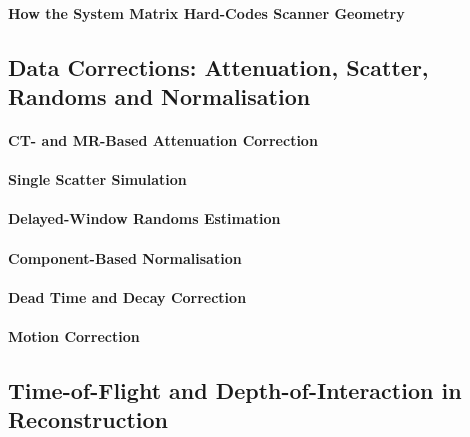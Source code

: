 \paragraph{How the System Matrix Hard-Codes Scanner Geometry}

\subsection{Data Corrections: Attenuation, Scatter, Randoms and Normalisation}
\label{sec:corrections}

\paragraph{CT- and MR-Based Attenuation Correction}

\paragraph{Single Scatter Simulation}

\paragraph{Delayed-Window Randoms Estimation}

\paragraph{Component-Based Normalisation}

\paragraph{Dead Time and Decay Correction}

\paragraph{Motion Correction}

\subsection{Time-of-Flight and Depth-of-Interaction in Reconstruction}


